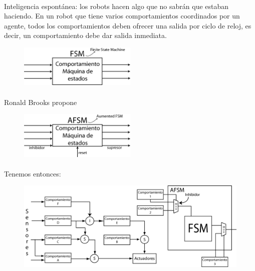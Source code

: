 \paragraph{}

Inteligencia espontánea: los robots hacen algo que no sabrán que estaban haciendo.
En un robot que tiene varios comportamientos coordinados por un agente, todos los comportamientos deben ofrecer una salida por ciclo de reloj, es decir, un comportamiento debe dar salida inmediata.

\begin{figure}[h!]
	\centering
	\includegraphics[width=0.5\textwidth]{images/img10.png}
	\label{figura10}
\end{figure}

\paragraph{}
Ronald Brooks propone

\begin{figure}[h!]
	\centering
	\includegraphics[width=0.5\textwidth]{images/img11.png}
	\label{figura11}
\end{figure}

\paragraph{}
Tenemos entonces:

\begin{figure}[h!]
	\centering
	\includegraphics[width=1\textwidth]{images/img12.png}
	\label{figura12}
\end{figure}


